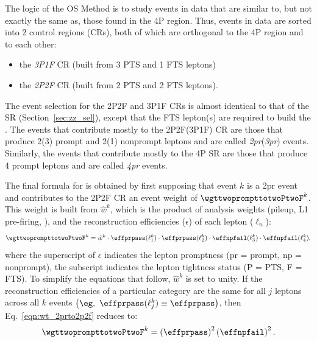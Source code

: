 The logic of the OS Method is to study events in data that are similar to, but not exactly the same as, those found in the 4P region.
Thus, events in data are sorted into 2 control regions (CRs), both of which are orthogonal to the 4P region and to each other:
\begin{itemize}
	\item the \emph{3P1F} CR (built from 3 PTS and 1 FTS leptons)
	\item the \emph{2P2F} CR (built from 2 PTS and 2 FTS leptons).
\end{itemize}
The event selection for the 2P2F and 3P1F CRs is almost identical to that of the SR (Section~\ref{sec:zz_sel}),
except that the FTS lepton(s) are required to build the \Ztwo.
The events that contribute mostly to the 2P2F(3P1F) CR are those that produce 2(3) prompt and 2(1) nonprompt leptons and are called \emph{2pr}(\emph{3pr}) events.
Similarly, the events that contribute mostly to the 4P SR are those that produce 4 prompt leptons and are called \emph{4pr} events.

The final formula for \nfourPRB is obtained by first supposing that event $k$ is a 2pr event and contributes to the 2P2F CR an event weight of $\wgttwoprompttotwoPtwoF^k$.
This weight is built from $\hat{w}^k$, which is the product of analysis weights (pileup, L1 pre-firing, \etc), and the reconstruction efficiencies ($\epsilon$) of each lepton ($\ell_n$):
\begin{equation}
	\label{eqn:wt_2prto2p2f}
	\wgttwoprompttotwoPtwoF^k = \hat{w}^k \cdot \effprpass(\ell_1^k) \cdot \effprpass(\ell_2^k) \cdot \effnpfail(\ell_3^k) \cdot \effnpfail(\ell_4^k),
\end{equation}
where the superscript of $\epsilon$ indicates the lepton promptness (pr = prompt, np = nonprompt),
the subscript indicates the lepton tightness status (P = PTS, F = FTS).
To simplify the equations that follow, $\hat{w}^k$ is set to unity.
If the reconstruction efficiencies of a particular category are the same for all $j$ leptons across all $k$ events $\left( \eg, ~ \effprpass(\ell_j^k) \equiv \effprpass \right)$, then Eq.~\ref{eqn:wt_2prto2p2f} reduces to:
\begin{equation}
	\label{eqn:wt_2prto2p2f_simp}
	\wgttwoprompttotwoPtwoF^k = 
	\left( \effprpass \right)^2 
	\left( \effnpfail \right)^2.
\end{equation}

